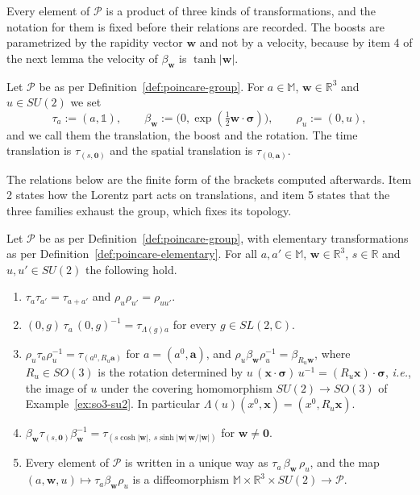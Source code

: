 Every element of $\mathcal{P}$ is a product of three kinds of transformations, and the notation for them is fixed before their relations are recorded. The boosts are parametrized by the rapidity vector $\mathbf{w}$ and not by a velocity, because by item 4 of the next lemma the velocity of $\beta_{\mathbf{w}}$ is $\tanh|\mathbf{w}|$.

\begin{definition}\label{def:poincare-elementary}
	Let $\mathcal{P}$ be as per Definition~\ref{def:poincare-group}. For $a\in\mathbb{M}$, $\mathbf{w}\in\mathbb{R}^3$ and $u\in SU(2)$ we set
	\begin{equation}
		\tau_a:=(a,\mathbb{1}),\qquad \beta_{\mathbf{w}}:=\big(0,\exp(\tfrac12\mathbf{w}\cdot\boldsymbol{\sigma})\big),\qquad \rho_u:=(0,u),
	\end{equation}
	and we call them the translation, the boost and the rotation. The time translation is $\tau_{(s,\mathbf{0})}$ and the spatial translation is $\tau_{(0,\mathbf{a})}$.
\end{definition}

The relations below are the finite form of the brackets computed afterwards. Item 2 states how the Lorentz part acts on translations, and item 5 states that the three families exhaust the group, which fixes its topology.

\begin{lemma}\label{lem:poincare-relations}
	Let $\mathcal{P}$ be as per Definition~\ref{def:poincare-group}, with elementary transformations as per Definition~\ref{def:poincare-elementary}. For all $a,a'\in\mathbb{M}$, $\mathbf{w}\in\mathbb{R}^3$, $s\in\mathbb{R}$ and $u,u'\in SU(2)$ the following hold.
	\begin{enumerate}
		\item $\tau_a\tau_{a'}=\tau_{a+a'}$ and $\rho_u\rho_{u'}=\rho_{uu'}$.
		\item $(0,g)\,\tau_a\,(0,g)^{-1}=\tau_{\Lambda(g)a}$ for every $g\in SL(2,\mathbb{C})$.
		\item $\rho_u\tau_a\rho_u^{-1}=\tau_{(a^0,R_u\mathbf{a})}$ for $a=(a^0,\mathbf{a})$, and $\rho_u\beta_{\mathbf{w}}\rho_u^{-1}=\beta_{R_u\mathbf{w}}$, where $R_u\in SO(3)$ is the rotation determined by $u\,(\mathbf{x}\cdot\boldsymbol{\sigma})\,u^{-1}=(R_u\mathbf{x})\cdot\boldsymbol{\sigma}$, \textit{i.e.}, the image of $u$ under the covering homomorphism $SU(2)\to SO(3)$ of Example~\ref{ex:so3-su2}. In particular $\Lambda(u)(x^0,\mathbf{x})=(x^0,R_u\mathbf{x})$.
		\item $\beta_{\mathbf{w}}\tau_{(s,\mathbf{0})}\beta_{\mathbf{w}}^{-1}=\tau_{(s\cosh|\mathbf{w}|,\ s\sinh|\mathbf{w}|\,\mathbf{w}/|\mathbf{w}|)}$ for $\mathbf{w}\neq\mathbf{0}$.
		\item Every element of $\mathcal{P}$ is written in a unique way as $\tau_a\,\beta_{\mathbf{w}}\,\rho_u$, and the map $(a,\mathbf{w},u)\mapsto\tau_a\beta_{\mathbf{w}}\rho_u$ is a diffeomorphism $\mathbb{M}\times\mathbb{R}^3\times SU(2)\to\mathcal{P}$.
	\end{enumerate}
\end{lemma}

